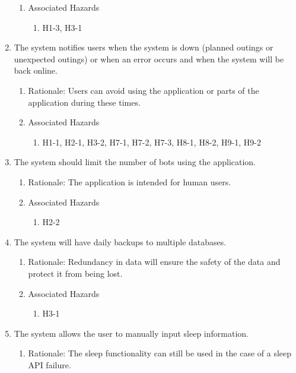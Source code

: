 \documentclass{article}
\begin{document}
\begin{enumerate}
\begin{enumerate}
        \item Associated Hazards
        \begin{enumerate}
            \item H1-3, H3-1
        \end{enumerate}
    \end{enumerate} 
     \item The system notifies users when the system is down (planned outings or unexpected outings) or when an error occurs and when the system will be back online. 
    \begin{enumerate}
        \item Rationale: Users can avoid using the application or parts of the application during these times. 
        \item Associated Hazards
        \begin{enumerate}
            \item H1-1, H2-1, H3-2, H7-1, H7-2, H7-3, H8-1, H8-2, H9-1, H9-2
        \end{enumerate}
    \end{enumerate}
    \item The system should limit the number of bots using the application.
    \begin{enumerate}
        \item Rationale: The application is intended for human users.
        \item Associated Hazards
        \begin{enumerate}
            \item H2-2
        \end{enumerate}
    \end{enumerate}
    \item The system will have daily backups to multiple databases.
    \begin{enumerate}
        \item Rationale: Redundancy in data will ensure the safety of the data and protect it from being lost.
        \item Associated Hazards
        \begin{enumerate}
            \item H3-1
        \end{enumerate}
    \end{enumerate}
     \item The system allows the user to manually input sleep information.
    \begin{enumerate}
        \item Rationale: The sleep functionality can still be used in the case of a sleep API failure.

\end{enumerate}
\end{enumerate}
\end{document}
